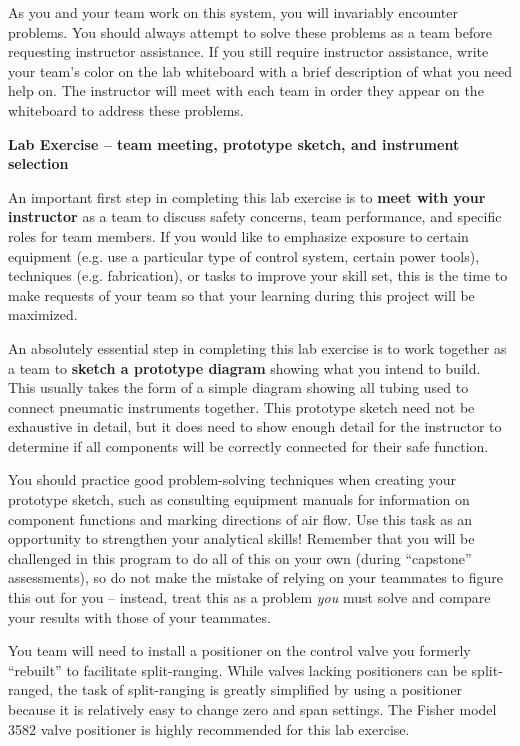 As you and your team work on this system, you will invariably encounter problems.  You should always attempt to solve these problems as a team before requesting instructor assistance.  If you still require instructor assistance, write your team's color on the lab whiteboard with a brief description of what you need help on.  The instructor will meet with each team in order they appear on the whiteboard to address these problems.


\vfil \eject

\noindent
{\bf Lab Exercise -- team meeting, prototype sketch, and instrument selection}

\vskip 5pt

An important first step in completing this lab exercise is to {\bf meet with your instructor} as a team to discuss safety concerns, team performance, and specific roles for team members.  If you would like to emphasize exposure to certain equipment (e.g. use a particular type of control system, certain power tools), techniques (e.g. fabrication), or tasks to improve your skill set, this is the time to make requests of your team so that your learning during this project will be maximized.

\vskip 10pt

An absolutely essential step in completing this lab exercise is to work together as a team to {\bf sketch a prototype diagram} showing what you intend to build.  This usually takes the form of a simple diagram showing all tubing used to connect pneumatic instruments together.  This prototype sketch need not be exhaustive in detail, but it does need to show enough detail for the instructor to determine if all components will be correctly connected for their safe function.

You should practice good problem-solving techniques when creating your prototype sketch, such as consulting equipment manuals for information on component functions and marking directions of air flow.  Use this task as an opportunity to strengthen your analytical skills!  Remember that you will be challenged in this program to do all of this on your own (during ``capstone'' assessments), so do not make the mistake of relying on your teammates to figure this out for you -- instead, treat this as a problem {\it you} must solve and compare your results with those of your teammates.

\vskip 10pt

You team will need to install a positioner on the control valve you formerly ``rebuilt'' to facilitate split-ranging.  While valves lacking positioners can be split-ranged, the task of split-ranging is greatly simplified by using a positioner because it is relatively easy to change zero and span settings.  The Fisher model 3582 valve positioner is highly recommended for this lab exercise.  

